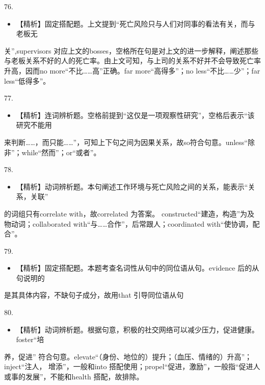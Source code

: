 \documentclass[UTF8,11pt]{ctexart}
\begin{document}
76.


\begin{itemize}[leftmargin=2em,itemsep=.2em,topsep=.4em]\item[A.] 【精析】固定搭配题。上文提到“死亡风险只与人们对同事的看法有关，而与老板无
\end{itemize}

关”,supervisors 对应上文的bosses，空格所在句是对上文的进一步解释，阐述那些与老板关系不好的人的死亡率。由上文可知，与上司的关系不好并不会导致死亡率升高，因而no more“不比……高”正确。far more“高得多”；no less“不比……少”；far less“低得多”。


77.


\begin{itemize}[leftmargin=2em,itemsep=.2em,topsep=.4em]\item[D.] 【精析】连词辨析题。空格前提到“这仅是一项观察性研究”，空格后表示“该研究不能用
\end{itemize}

来判断……，而只能……”，可知上下句之间为因果关系，故so符合句意。unless“除非”；while“然而”；or“或者”。


78.


\begin{itemize}[leftmargin=2em,itemsep=.2em,topsep=.4em]\item[B.] 【精析】动词辨析题。本句阐述工作环境与死亡风险之间的关系，能表示“关系，关联”
\end{itemize}

的词组只有correlate with，故correlated 为答案。 constructed“建造，构造”为及物动词；collaborated with“与……合作”，后常跟人；coordinated with“使协调，配合”。


79.


\begin{itemize}[leftmargin=2em,itemsep=.2em,topsep=.4em]\item[C.] 【精析】固定搭配题。本题考查名词性从句中的同位语从句。evidence 后的从句说明的
\end{itemize}

是其具体内容，不缺句子成分，故用that 引导同位语从句


80.


\begin{itemize}[leftmargin=2em,itemsep=.2em,topsep=.4em]\item[D.] 【精析】动词辨析题。根据句意，积极的社交网络可以减少压力，促进健康。foster“培
\end{itemize}

养，促进” 符合句意。elevate“（身份、地位的）提升；（血压、情绪的）升高”；inject“注人， 增添”，一般和into 搭配使用；propel“促进，激励”，一般指“促进人或事的发展”，不能和health 搭配，故排除。
\end{document}
